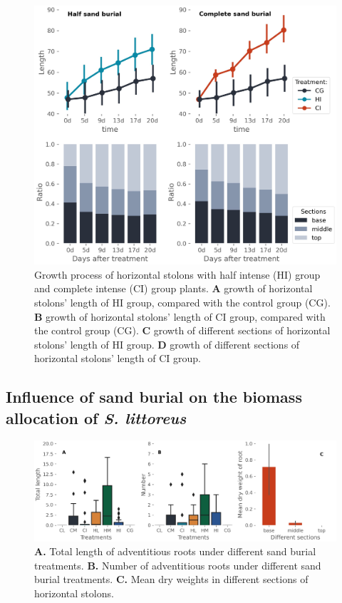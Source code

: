 \documentclass[]{interact}
\theoremstyle{plain}%
\theoremstyle{definition}
\theoremstyle{remark}
\begin{document}
\begin{figure}[!h]
  \centering
  \includegraphics[scale=0.7]{../figs/growth_process.jpg}
  \caption{
    Growth process of horizontal stolons with half intense (HI) group and complete intense (CI) group plants.
    \textbf{A} growth of horizontal stolons' length of HI group, compared with the control group (CG).
    \textbf{B} growth of horizontal stolons' length of CI group, compared with the control group (CG).
    \textbf{C} growth of different sections of horizontal stolons' length of HI group.
    \textbf{D} growth of different sections of horizontal stolons' length of CI group.
  }
  \label{fig:growth}
\end{figure}


\subsection{Influence of sand burial on the biomass allocation of \textit{S. littoreus}}
\begin{figure}
  \centering
  \includegraphics[scale=0.6]{../figs/roots.jpg}
  \caption{
    \textbf{A.} Total length of adventitious roots under different sand burial treatments.
    \textbf{B.} Number of adventitious roots under different sand burial treatments.
    \textbf{C.} Mean dry weights in different sections of horizontal stolons.
  }
  \label{fig:roots}
\end{figure}
\end{document}
